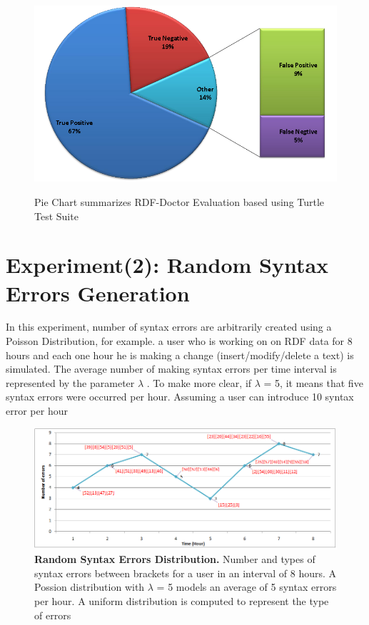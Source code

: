 \begin{figure}[ht]
\begin{center}
		\includegraphics[scale=0.5,angle=0]{images/PieChartExperiment1.png}

		\label{Fig:pieChartExperiment1}
		\caption{Pie Chart summarizes RDF-Doctor Evaluation based using Turtle Test Suite \cite{TurtleTests:Online} }
\end{center}
\end{figure}
\section{Experiment(2): Random Syntax Errors Generation}
In this experiment, number of syntax errors are arbitrarily created using a Poisson Distribution, for example. a user who is working on on RDF data for 8 hours and each one hour he is making a change (insert/modify/delete a text) is simulated. The average number of making syntax errors per time interval is represented by the parameter $\lambda$ . To make more clear, if   $\lambda$ = 5, it means that five syntax errors were occurred per hour.  Assuming a user can introduce 10 syntax error per hour

	\begin{figure}[ht]
	\begin{center}
		\includegraphics[scale=0.58,angle=0]{images/experiment2.png}
				\setlength\belowcaptionskip{-7mm}
		\caption{\textbf{Random Syntax Errors Distribution.} Number and types of syntax errors between brackets for a user in an interval of 8 hours. A Possion distribution with $\lambda$ = 5 models an average of 5 syntax errors per hour. A uniform distribution is computed to represent the type of errors} 
		\label{Fig:experiment2}
	\end{center}
\end{figure}
